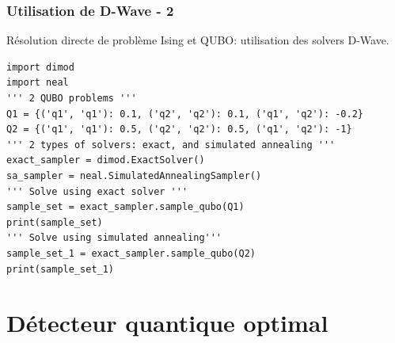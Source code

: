 \documentclass{beamer}
\begin{document}
\begin{frame}[fragile]
    \frametitle{Utilisation de D-Wave - 2}
    Résolution directe de problème Ising et QUBO: utilisation des solvers D-Wave.
    \begin{lstlisting}[style=CStyle, basicstyle=\tiny]
import dimod
import neal
''' 2 QUBO problems '''
Q1 = {('q1', 'q1'): 0.1, ('q2', 'q2'): 0.1, ('q1', 'q2'): -0.2}
Q2 = {('q1', 'q1'): 0.5, ('q2', 'q2'): 0.5, ('q1', 'q2'): -1}
''' 2 types of solvers: exact, and simulated annealing '''
exact_sampler = dimod.ExactSolver()
sa_sampler = neal.SimulatedAnnealingSampler()
''' Solve using exact solver '''
sample_set = exact_sampler.sample_qubo(Q1)
print(sample_set)
''' Solve using simulated annealing'''
sample_set_1 = exact_sampler.sample_qubo(Q2)
print(sample_set_1)

\end{lstlisting}
\end{frame}

\section[Détection optimale]{Détecteur quantique optimal}

\begin{frame}
\end{frame}
\end{document}
